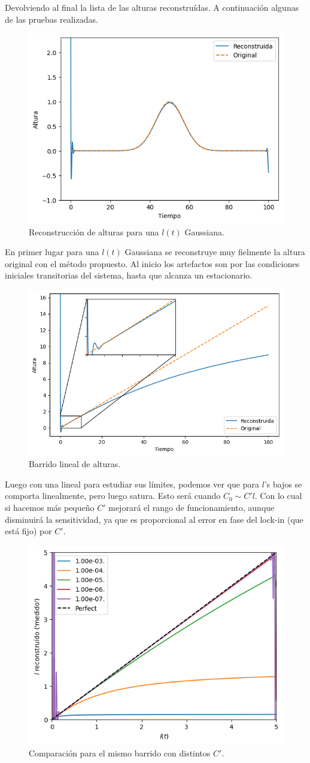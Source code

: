 Devolviendo al final la lista de las alturas reconstruídas. A continuación algunas de las pruebas realizadas.


\begin{figure}[!ht]
	\centering
	\includegraphics[width=0.45167\linewidth]{Figures/31_03_2025/Altura_gaussiana}
	\caption{Reconstrucción de alturas para una $l(t)$ Gaussiana.}
	\label{fig:alturagaussiana}
\end{figure}

En primer lugar para una $l(t)$ Gaussiana se reconstruye muy fielmente la altura original con el método propuesto. Al inicio los artefactos son por las condiciones iniciales transitorias del sistema, hasta que alcanza un estacionario.

\begin{figure}[!ht]
	\centering
	\includegraphics[width=0.45167\linewidth]{Figures/31_03_2025/Altura_lineal}
	\caption{Barrido lineal de alturas.}
	\label{fig:alturalineal}
\end{figure}


Luego con una lineal para estudiar sus límites, podemos ver que para $l$'s bajos se comporta linealmente, pero luego satura. Esto será cuando $C_0 \sim C'l$. Con lo cual si hacemos más pequeño $C'$ mejorará el rango de funcionamiento, aunque disminuirá la sensitividad, ya que es proporcional al error en fase del lock-in (que está fijo) por $C'$.

\begin{figure}[!ht]
	\centering
	\includegraphics[width=0.4516\linewidth]{Figures/31_03_2025/Altura_lineal_varios_Cp}
	\caption{Comparación para el mismo barrido con distintos $C'$.}
	\label{fig:alturalinealvarioscp}
\end{figure}

